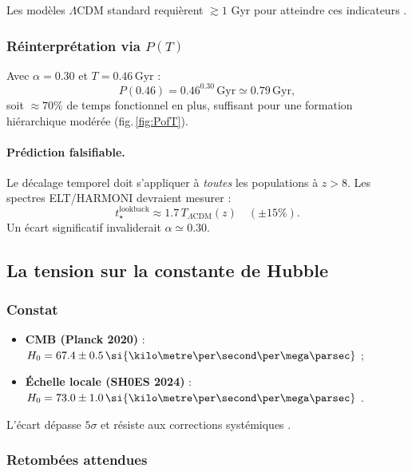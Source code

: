 \documentclass[11pt]{article}
\begin{document}
Les modèles \(\Lambda\)CDM standard requièrent
\(\gtrsim1\) Gyr pour atteindre ces indicateurs
\parencite{Labbé2024,Naidu2024}.

\subsubsection*{Réinterprétation via \(P(T)\)}

Avec \(\alpha=0.30\) et \(T=0.46\,\mathrm{Gyr}\) :
\[
P(0.46)=0.46^{0.30}\,\mathrm{Gyr}\simeq0.79\,\text{Gyr},
\]
soit \(\approx70\%\) de temps fonctionnel en plus,
suffisant pour une formation hiérarchique modérée
(fig.\,\ref{fig:PofT}).

\paragraph{Prédiction falsifiable.}
Le décalage temporel doit s’appliquer à \emph{toutes} les
populations à \(z>8\). Les spectres ELT/HARMONI devraient mesurer :
\[
t_\star^{\text{lookback}}\approx1.7\,
T_{\Lambda\mathrm{CDM}}(z)\quad(\pm15\%).
\]
Un écart significatif invaliderait \(\alpha\simeq0.30\).

\subsection{La tension sur la constante de Hubble}

\subsubsection*{Constat}

\begin{itemize}
  \item \textbf{CMB (Planck 2020)} :
        \(H_0 = 67.4 \pm 0.5\,
        \si{\kilo\metre\per\second\per\mega\parsec}\)
        \parencite{Planck2020};
  \item \textbf{Échelle locale (SH0ES 2024)} :
        \(H_0 = 73.0 \pm 1.0\,
        \si{\kilo\metre\per\second\per\mega\parsec}\)
        \parencite{SH0ES2024}.
\end{itemize}

L’écart dépasse \(5\sigma\) et résiste aux corrections systémiques
\parencite{DiValentino2021}.


\subsubsection{Retombées attendues}
\end{document}
